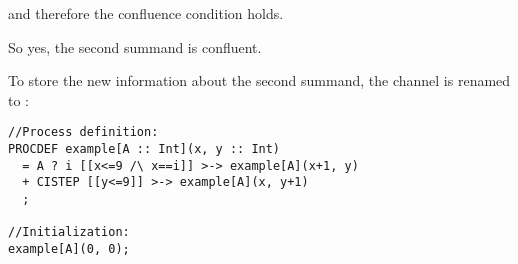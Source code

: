 and therefore the confluence condition holds.

So yes, the second summand is confluent.

To store the new information about the second summand, the channel is renamed to \cistep{}:

\begin{lstlisting}
//Process definition:
PROCDEF example[A :: Int](x, y :: Int)
  = A ? i [[x<=9 /\ x==i]] >-> example[A](x+1, y)
  + CISTEP [[y<=9]] >-> example[A](x, y+1)
  ;

//Initialization:
example[A](0, 0);
\end{lstlisting}

